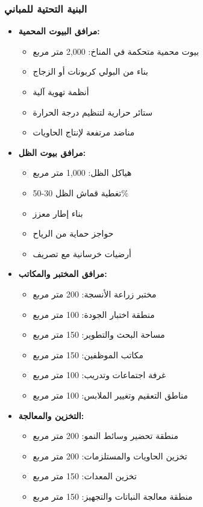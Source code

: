 \subsubsection{البنية التحتية للمباني}
\begin{itemize}
    \item \textbf{مرافق البيوت المحمية:}
    \begin{itemize}
        \item بيوت محمية متحكمة في المناخ: 2,000 متر مربع
        \item بناء من البولي كربونات أو الزجاج
        \item أنظمة تهوية آلية
        \item ستائر حرارية لتنظيم درجة الحرارة
        \item مناضد مرتفعة لإنتاج الحاويات
    \end{itemize}
    
    \item \textbf{مرافق بيوت الظل:}
    \begin{itemize}
        \item هياكل الظل: 1,000 متر مربع
        \item تغطية قماش الظل 30-50\%
        \item بناء إطار معزز
        \item حواجز حماية من الرياح
        \item أرضيات خرسانية مع تصريف
    \end{itemize}
    
    \item \textbf{مرافق المختبر والمكاتب:}
    \begin{itemize}
        \item مختبر زراعة الأنسجة: 200 متر مربع
        \item منطقة اختبار الجودة: 100 متر مربع
        \item مساحة البحث والتطوير: 150 متر مربع
        \item مكاتب الموظفين: 150 متر مربع
        \item غرفة اجتماعات وتدريب: 100 متر مربع
        \item مناطق التعقيم وتغيير الملابس: 100 متر مربع
    \end{itemize}
    
    \item \textbf{التخزين والمعالجة:}
    \begin{itemize}
        \item منطقة تحضير وسائط النمو: 200 متر مربع
        \item تخزين الحاويات والمستلزمات: 200 متر مربع
        \item تخزين المعدات: 150 متر مربع
        \item منطقة معالجة النباتات والتجهيز: 150 متر مربع
    \end{itemize}
\end{itemize}

